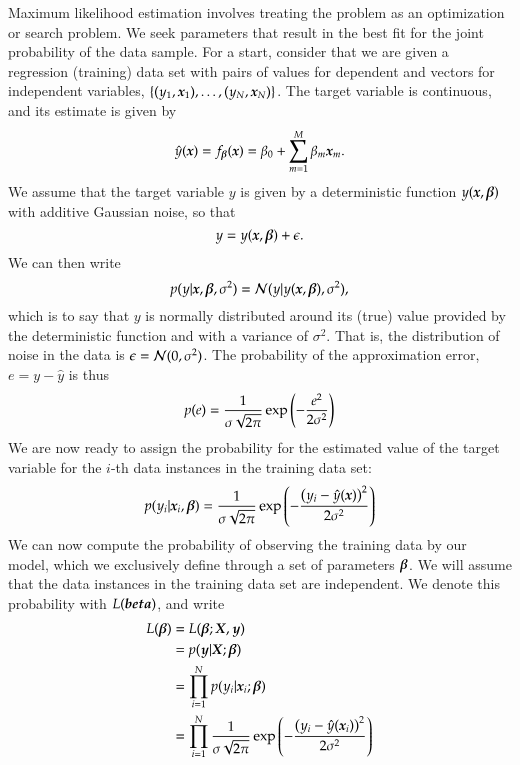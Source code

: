 \begin{refsection}
Maximum likelihood estimation involves treating the problem as an optimization or search problem. We seek parameters that result in the best fit for the joint probability of the data sample. For a start, consider that we are given a regression (training) data set with pairs of values for dependent and vectors for independent variables, $\{(y_1,\boldsymbol{x}_1), \ldots, (y_N,\boldsymbol{x}_N)\}$. The target variable is continuous, and its estimate is given by
\begin{equation}
\hat y(\boldsymbol{x})=f_{\boldsymbol{\beta}}(\boldsymbol{x})=\beta_0+\sum_{m=1}^M\beta_m\boldsymbol{x}_m.
\end{equation}
We assume that the target variable $y$ is given by a deterministic function $y(\boldsymbol{x},\boldsymbol{\beta})$ with additive Gaussian noise, so that
\begin{equation}
y=y(\boldsymbol{x},\boldsymbol{\beta})+\epsilon.
\end{equation}
We can then write
\begin{equation}
p(y|\boldsymbol{x},\boldsymbol{\beta},\sigma^2) = \mathcal{N}(y|y(\boldsymbol{x},\boldsymbol{\beta}),\sigma^2),
\end{equation}
which is to say that $y$ is normally distributed around its (true) value provided by the deterministic function and with a variance of $\sigma^2$. That is, the distribution of noise in the data is $\epsilon=\mathcal{N}(0,\sigma^2)$.  The probability of the approximation error, $e=y-\hat{y}$ is thus
\begin{equation}
p(e)={1\over\sigma\sqrt{2\pi}}\exp\left({-{e^2\over 2\sigma^2}}\right)
\end{equation}
We are now ready to assign the probability for the estimated value of the target variable for the $i$-th data instances in the training data set:
\begin{equation}
p(y_i|\boldsymbol{x}_i,\boldsymbol{\beta}) = {1\over\sigma\sqrt{2\pi}}\exp\left({-{\left(y_i-\hat{y}(\boldsymbol{x})\right)^2\over 2\sigma^2}}\right)
\end{equation}
We can now compute the probability of observing the training data by our model, which we exclusively define through a set of parameters $\boldsymbol{\beta}$. We will assume that the data instances in the training data set are independent. We denote this probability with $L(\boldsymbol{beta})$, and write
\begin{align}
L(\boldsymbol{\beta}) & = L(\boldsymbol{\beta}; \boldsymbol{X}, \boldsymbol{y}) \\
& = p(\boldsymbol{y}|\boldsymbol{X};\boldsymbol{\beta}) \\
& = \prod_{i=1}^N p(y_i|\boldsymbol{x}_i;\boldsymbol{\beta}) \\
& = \prod_{i=1}^N {1\over\sigma\sqrt{2\pi}} \exp\left({-{\left(y_i-\hat{y}(\boldsymbol{x}_i)\right)^2\over 2\sigma^2}}\right)
\end{align}


\end{refsection}
